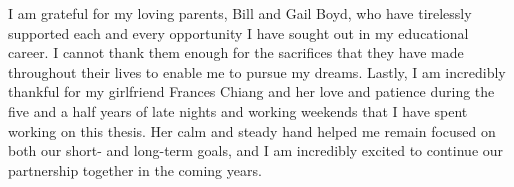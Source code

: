 I am grateful for my loving parents, Bill and Gail Boyd, who have tirelessly supported each and every opportunity I have sought out in my educational career. I cannot thank them enough for the sacrifices that they have made throughout their lives to enable me to pursue my dreams. Lastly, I am incredibly thankful for my girlfriend Frances Chiang and her love and patience during the five and a half years of late nights and working weekends that I have spent working on this thesis. Her calm and steady hand helped me remain focused on both our short- and long-term goals, and I am incredibly excited to continue our partnership together in the coming years.


